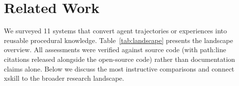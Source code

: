 \documentclass{article}
\begin{document}
\section{Related Work}
\label{sec:related}

We surveyed 11 systems that convert agent trajectories or experiences into reusable procedural knowledge. Table~\ref{tab:landscape} presents the landscape overview. All assessments were verified against source code (with path:line citations released alongside the open-source code) rather than documentation claims alone. Below we discuss the most instructive comparisons and connect xskill to the broader research landscape.
\end{document}
